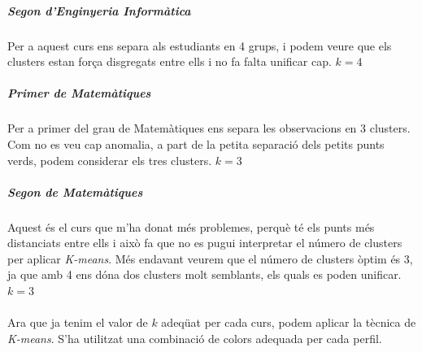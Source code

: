\documentclass[12pt,a4paper,catalan]{article}
\begin{document}
\subparagraph{Segon d'Enginyeria Informàtica}
Per a aquest curs ens separa als estudiants en 4 grups, i podem veure que els clusters estan força disgregats entre ells i no fa falta unificar cap.  $k=4$

\subparagraph{Primer de Matemàtiques} 
Per a primer del grau de Matemàtiques ens separa les observacions en 3 clusters. Com no es veu cap anomalia, a part de la petita separació dels petits punts verds, podem considerar els tres clusters.  $k=3$

\subparagraph{Segon de Matemàtiques}
Aquest és el curs que m'ha donat més problemes, perquè té els punts més distanciats entre ells i això fa que no es pugui interpretar el número de clusters per aplicar \textit{K-means}. Més endavant veurem que el número de clusters òptim és 3, ja que amb 4 ens dóna dos clusters molt semblants, els quals es poden unificar. $k=3$
\\
\\
Ara que ja tenim el valor de $k$ adeqüat per cada curs, podem aplicar la tècnica de \textit{K-means}. S'ha utilitzat una combinació de colors adequada per cada perfil.
\end{document}
